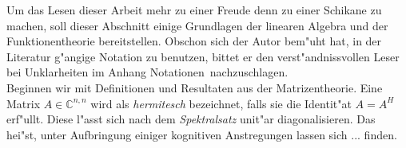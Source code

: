 \documentclass[a4paper, 11pt]{article}
\newcommand{\Cnn}{\mathbb{C}^{n,n}}
\begin{document}
Um das Lesen dieser Arbeit mehr zu einer Freude denn zu einer Schikane zu
machen, soll dieser Abschnitt einige Grundlagen der linearen Algebra und
der Funktionentheorie bereitstellen. Obschon sich der Autor bem"uht hat,
in der Literatur g"angige Notation zu benutzen, bittet er den
verst"andnissvollen Leser bei Unklarheiten im Anhang \glqq Notationen\grqq\
nachzuschlagen.\\

Beginnen wir mit Definitionen und Resultaten aus der Matrizentheorie.
Eine Matrix $A\in\Cnn$ wird als \emph{hermitesch} bezeichnet, falls
sie die Identit"at $A=A^H$ erf"ullt. Diese l"asst sich nach dem
\emph{Spektralsatz} unit"ar diagonalisieren. Das hei"st,
unter Aufbringung einiger kognitiven Anstregungen lassen sich ... finden.
\end{document}
